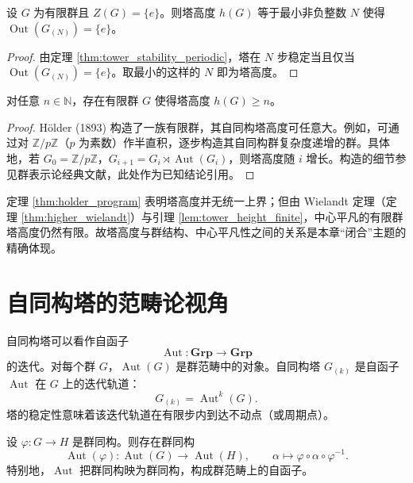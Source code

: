 \begin{corollary}[塔高度的判定]\label{cor:tower_height_criterion}
设 $G$ 为有限群且 $Z(G)=\{e\}$。则塔高度 $h(G)$ 等于最小非负整数 $N$ 使得 $\operatorname{Out}(G_{(N)})=\{e\}$。
\end{corollary}

\begin{proof}
由定理 \ref{thm:tower_stability_periodic}，塔在 $N$ 步稳定当且仅当 $\operatorname{Out}(G_{(N)})=\{e\}$。取最小的这样的 $N$ 即为塔高度。
\end{proof}

\begin{theorem}\label{thm:holder_program}
对任意 $n\in\mathbb{N}$，存在有限群 $G$ 使得塔高度 $h(G)\ge n$。
\end{theorem}

\begin{proof}
Hölder (1893) 构造了一族有限群，其自同构塔高度可任意大。例如，可通过对 $\mathbb{Z}/p\mathbb{Z}$（$p$ 为素数）作半直积，逐步构造其自同构群复杂度递增的群。具体地，若 $G_0 = \mathbb{Z}/p\mathbb{Z}$，$G_{i+1} = G_i \rtimes \operatorname{Aut}(G_i)$，则塔高度随 $i$ 增长。构造的细节参见群表示论经典文献，此处作为已知结论引用。
\end{proof}

\begin{remark}\label{rem:holder_program_boundary}
定理 \ref{thm:holder_program} 表明塔高度并无统一上界；但由 Wielandt 定理（定理 \ref{thm:higher_wielandt}）与引理 \ref{lem:tower_height_finite}，中心平凡的有限群塔高度仍然有限。故塔高度与群结构、中心平凡性之间的关系是本章“闭合”主题的精确体现。
\end{remark}

\section{自同构塔的范畴论视角}

\begin{remark}[自同构塔的函子性]\label{rem:tower_categorical}
自同构塔可以看作自函子
\[
\operatorname{Aut}: \mathbf{Grp} \to \mathbf{Grp}
\]
的迭代。对每个群 $G$，$\operatorname{Aut}(G)$ 是群范畴中的对象。自同构塔 $G_{(k)}$ 是自函子 $\operatorname{Aut}$ 在 $G$ 上的迭代轨道：
\[
G_{(k)} = \operatorname{Aut}^k(G).
\]
塔的稳定性意味着该迭代轨道在有限步内到达不动点（或周期点）。
\end{remark}

\begin{proposition}[自同构函子的协变性]\label{prop:aut_functor}
设 $\varphi: G\to H$ 是群同构。则存在群同构
\[
\operatorname{Aut}(\varphi): \operatorname{Aut}(G)\to\operatorname{Aut}(H),\qquad \alpha\mapsto \varphi\circ\alpha\circ\varphi^{-1}.
\]
特别地，$\operatorname{Aut}$ 把群同构映为群同构，构成群范畴上的自函子。
\end{proposition}

